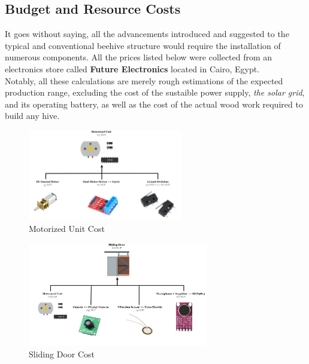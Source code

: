 \documentclass[12pt]{article}
\begin{document}
	\subsection{Budget and Resource Costs}
	It goes without saying, all the advancements introduced and suggested to the typical and conventional beehive structure would require the installation of numerous components. All the prices listed below were collected from an electronics store called \textbf{Future Electronics} \cite{fut_electronics}located in Cairo, Egypt. \\ \newline
	Notably, all these calculations are merely rough estimations of the expected production range, excluding the cost of the sustaible power supply, \textit{the solar grid}, and its operating battery, as well as the cost of the actual wood work required to build any hive.
	\vspace{0.5 cm}
	\begin{figure}[H]
		\centering
		\includegraphics[width=0.6\textwidth]{Images/Components/Motorized Unit Cost.png}
		\caption{Motorized Unit Cost }
		\label{fig:MOTORIZED_COST}
	\end{figure}
	\vspace{0.5 cm}
	\begin{figure}[H]
		\centering
		\includegraphics[width=0.7\textwidth]{Images/Components/Sliding Door Cost.png}
		\caption{Sliding Door Cost }
		\label{fig:DOOR_COST}
	\end{figure}
\end{document}
